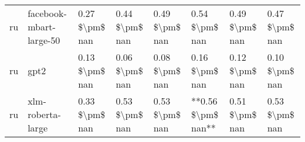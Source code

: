 \begin{tabular}{llllllll}
      ru &            facebook-mbart-large-50 & 0.27 \$\textbackslash pm\$ nan &            0.44 \$\textbackslash pm\$ nan &        0.49 \$\textbackslash pm\$ nan &         0.54 \$\textbackslash pm\$ nan &                          0.49 \$\textbackslash pm\$ nan &     0.47 \$\textbackslash pm\$ nan \\
      ru &                               gpt2 & 0.13 \$\textbackslash pm\$ nan &            0.06 \$\textbackslash pm\$ nan &        0.08 \$\textbackslash pm\$ nan &         0.16 \$\textbackslash pm\$ nan &                          0.12 \$\textbackslash pm\$ nan &     0.10 \$\textbackslash pm\$ nan \\
      ru &                  xlm-roberta-large & 0.33 \$\textbackslash pm\$ nan &            0.53 \$\textbackslash pm\$ nan &        0.53 \$\textbackslash pm\$ nan &     **0.56 \$\textbackslash pm\$ nan** &                          0.51 \$\textbackslash pm\$ nan &     0.53 \$\textbackslash pm\$ nan \\
\bottomrule
\end{tabular}
